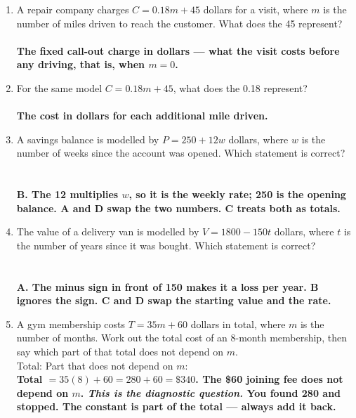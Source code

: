\documentclass[11pt,a4paper]{article}
\newcommand{\ans}[1]{\ {\color{keyred}\bfseries #1}}
\newcommand{\ans}[1]{}
\begin{document}
\begin{enumerate}[leftmargin=20pt,itemsep=10pt]
\item A repair company charges $C=0.18m+45$ dollars for a visit, where $m$ is the number
  of miles driven to reach the customer. What does the 45 represent?\\
  \underline{\hspace{\linewidth}}
  \ans{\\ The fixed call-out charge in dollars --- what the visit costs before any
  driving, that is, when $m=0$.}

\item For the same model $C=0.18m+45$, what does the 0.18 represent?\\
  \underline{\hspace{\linewidth}}
  \ans{\\ The cost in dollars for each additional mile driven.}

\item A savings balance is modelled by $P=250+12w$ dollars, where $w$ is the number of
  weeks since the account was opened. Which statement is correct?\\
  \\[2pt]
  \ans{\\ B. The 12 multiplies $w$, so it is the weekly rate; 250 is the opening
  balance. A and D swap the two numbers. C treats both as totals.}

\item The value of a delivery van is modelled by $V=1800-150t$ dollars, where $t$ is the
  number of years since it was bought. Which statement is correct?\\
  \\[2pt]
  \ans{\\ A. The minus sign in front of 150 makes it a loss per year. B ignores the
  sign. C and D swap the starting value and the rate.}

\item A gym membership costs $T=35m+60$ dollars in total, where $m$ is the number of
  months. Work out the total cost of an 8-month membership, then say which part of that
  total does not depend on $m$.\\
  Total: \underline{\hspace{3cm}} \hfill Part that does not depend on $m$:
  \underline{\hspace{3.6cm}}
  \ans{\\ Total $=35(8)+60=280+60=\$340$. The \$60 joining fee does not depend on $m$.
  \emph{This is the diagnostic question.} You found 280 and stopped. The constant is
  part of the total --- always add it back.}


\end{enumerate}
\end{document}

